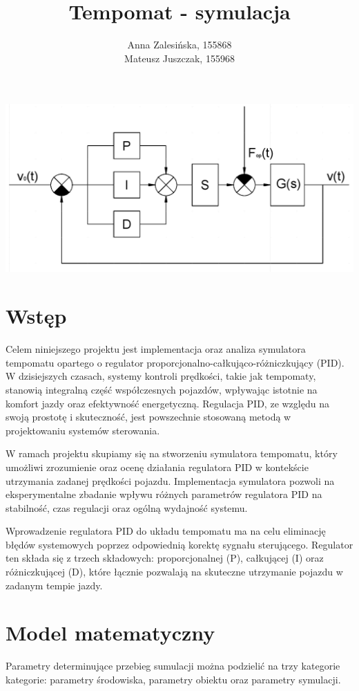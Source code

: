 \documentclass[12pt,a4paper]{article}
\begin{document}
	\title{Tempomat - symulacja}
	\author{Anna Zalesińska, 155868 \\ Mateusz Juszczak, 155968}
	\date{}
	\maketitle
	
	\begin{center}
		\includegraphics[scale=0.45]{"ehh.png"}
	\end{center}
	\section{Wstęp}
	Celem niniejszego projektu jest implementacja oraz analiza symulatora tempomatu opartego o regulator proporcjonalno-całkująco-różniczkujący (PID). W dzisiejszych czasach, systemy kontroli prędkości, takie jak tempomaty, stanowią integralną część współczesnych pojazdów, wpływając istotnie na komfort jazdy oraz efektywność energetyczną. Regulacja PID, ze względu na swoją prostotę i skuteczność, jest powszechnie stosowaną metodą w projektowaniu systemów sterowania.
	
	W ramach projektu skupiamy się na stworzeniu symulatora tempomatu, który umożliwi zrozumienie oraz ocenę działania regulatora PID w kontekście utrzymania zadanej prędkości pojazdu. Implementacja symulatora pozwoli na eksperymentalne zbadanie wpływu różnych parametrów regulatora PID na stabilność, czas regulacji oraz ogólną wydajność systemu.
	
	Wprowadzenie regulatora PID do układu tempomatu ma na celu eliminację błędów systemowych poprzez odpowiednią korektę sygnału sterującego. Regulator ten składa się z trzech składowych: proporcjonalnej (P), całkującej (I) oraz różniczkującej (D), które łącznie pozwalają na skuteczne utrzymanie pojazdu w zadanym tempie jazdy.
	
	\section{Model matematyczny}
	Parametry determinujące przebieg sumulacji można podzielić na trzy kategorie kategorie: parametry środowiska, parametry obiektu oraz parametry symulacji.
	
\end{document}
